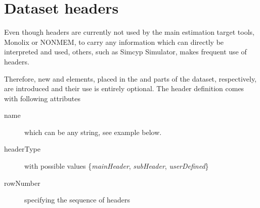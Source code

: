 \section{Dataset headers}
\label{sec:headers}
Even though headers are currently not used by the main estimation target 
tools, Monolix or NONMEM, to carry any information which can directly be interpreted 
and used, others, such as Simcyp Simulator, makes frequent use of headers. 

Therefore, new  and  elements, placed in the 
 and  parts of the dataset, respectively, 
are introduced and their use is entirely optional. The header definition comes with 
following attributes
\begin{description}
\item[name] which can be any string, see example below. 
\item[headerType] with possible values \{\emph{mainHeader}, \emph{subHeader},
\emph{userDefined}\} 
\item[rowNumber] specifying the sequence of headers  
\end{description}

